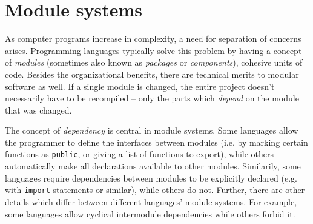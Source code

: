 \section{Module systems}


As computer programs increase in complexity, a need for separation of concerns arises. Programming languages typically solve this problem by having a concept of \emph{modules} (sometimes also known as \emph{packages} or \emph{components}), cohesive units of code. Besides the organizational benefits, there are technical merits to modular software as well. If a single module is changed, the entire project doesn't necessarily have to be recompiled -- only the parts which \emph{depend} on the module that was changed.

The concept of \emph{dependency} is central in module systems. Some languages allow the programmer to define the interfaces between modules (i.e. by marking certain functions as \texttt{public}, or giving a list of functions to export), while others automatically make all declarations available to other modules. Similarily, some languages require dependencies between modules to be explicitly declared (e.g. with \texttt{import} statements or similar), while others do not. Further, there are other details which differ between different languages' module systems. For example, some languages allow cyclical intermodule dependencies while others forbid it. 